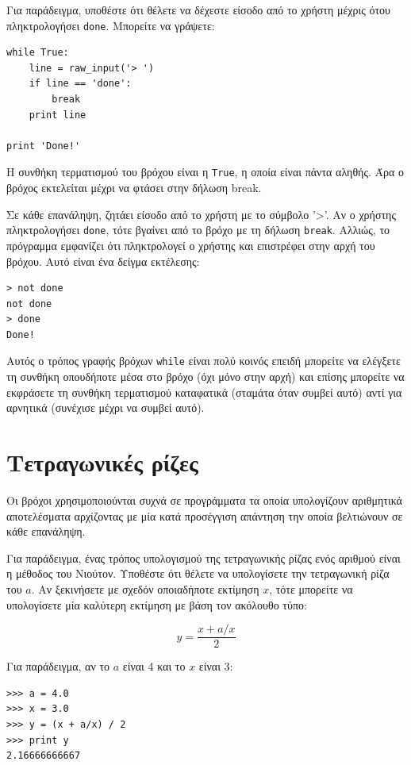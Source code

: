 \documentclass[10pt]{book}
\begin{document}
Για παράδειγμα, υποθέστε ότι θέλετε να δέχεστε είσοδο από το χρήστη μέχρις ότου
πληκτρολογήσει {\tt done}. Μπορείτε να γράψετε:

\begin{verbatim}
while True:
    line = raw_input('> ')
    if line == 'done':
        break
    print line

print 'Done!'
\end{verbatim}
%

Η συνθήκη τερματισμού του βρόχου είναι η {\tt True}, η οποία είναι
πάντα αληθής. Άρα ο βρόχος εκτελείται μέχρι να φτάσει στην δήλωση break.

Σε κάθε επανάληψη, ζητάει είσοδο από το χρήστη με το σύμβολο '>'.
Αν ο χρήστης πληκτρολογήσει {\tt done}, τότε βγαίνει από το βρόχο με τη δήλωση
{\tt break}. Αλλιώς, το πρόγραμμα εμφανίζει ότι πληκτρολογεί ο χρήστης και
επιστρέφει στην αρχή του βρόχου. Αυτό είναι ένα δείγμα εκτέλεσης:

\begin{verbatim}
> not done
not done
> done
Done!
\end{verbatim}
%

Αυτός ο τρόπος γραφής βρόχων {\tt while} είναι πολύ κοινός
επειδή μπορείτε να ελέγξετε τη συνθήκη οπουδήποτε μέσα στο βρόχο (όχι
μόνο στην αρχή) και επίσης μπορείτε να εκφράσετε τη συνθήκη τερματισμού
καταφατικά (σταμάτα όταν συμβεί αυτό) αντί για αρνητικά
(συνέχισε μέχρι να συμβεί αυτό).


\section{Τετραγωνικές ρίζες}
\label{squareroot}

Οι βρόχοι χρησιμοποιούνται συχνά σε προγράμματα τα οποία
υπολογίζουν αριθμητικά αποτελέσματα αρχίζοντας με μία κατά προσέγγιση 
απάντηση την οποία βελτιώνουν σε κάθε επανάληψη.

Για παράδειγμα, ένας τρόπος υπολογισμού της τετραγωνικής ρίζας ενός αριθμού
είναι η μέθοδος του Νιούτον. Υποθέστε ότι θέλετε να υπολογίσετε την τετραγωνική ρίζα του $a$. Αν ξεκινήσετε με σχεδόν οποιαδήποτε εκτίμηση $x$, τότε μπορείτε
να υπολογίσετε μία καλύτερη εκτίμηση με βάση τον ακόλουθο τύπο:

\[ y = \frac{x + a/x}{2} \]
%

Για παράδειγμα, αν το $a$ είναι 4 και το $x$ είναι 3:

\begin{verbatim}
>>> a = 4.0
>>> x = 3.0
>>> y = (x + a/x) / 2
>>> print y
2.16666666667
\end{verbatim}
%
\end{document}
